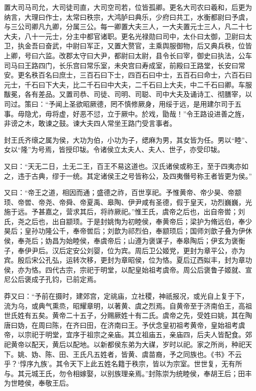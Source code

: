 \documentclass[12pt,UTF8]{ctexbook}
\begin{document}
置大司马司允，大司徒司直，大司空司若，位皆孤卿。更名大司农曰羲和，后更为纳言，大理曰作士，太常曰秩宗，大鸿胪曰典乐，少府曰共工，水衡都尉曰予虞，与三公司卿凡九卿，分属三公。每一卿置大夫三人，一大夫置元士三人，凡二十七大夫，八十一元士，分主中都官诸职。更名光禄勋曰司中，太仆曰太御，卫尉曰太卫，执金吾曰奋武，中尉曰军正，又置大赘官，主乘舆服御物，后又典兵秩，位皆上卿，号曰六监。改郡太守曰大尹，都尉曰太尉，县令长曰宰，御史曰执法，公车司马曰王路四门，长乐宫曰常乐室，未央宫曰寿成室，前殿曰王路堂，长安曰常安。更名秩百名曰庶士，三百石曰下士，四百石曰中士，五百石曰命士，六百石曰元士，千石曰下大夫，比二千石曰中大夫，二千石曰上大夫，中二千石曰卿。车服黻冕，各有差品。又置司恭、司徒、司明、司聪、司中大夫及诵诗工、彻膳宰，以司过。策曰：“予闻上圣欲昭厥德，罔不慎修厥身，用绥于远，是用建尔司于五事。毋隐尤，毋将虚，好恶不愆，立于厥中。於戏，勖哉！”令王路设进善之旌，非谤之木，敢谏之鼓。谏大夫四人常坐王路门受言事者。



封王氏齐缞之属为侯，大功为伯，小功为子，缌麻为男，其女皆为任。男以“睦”、女以“隆”为号焉，皆授印韨。令诸侯立太夫人、夫人、世子，亦受印韨。



又曰：“天无二日，土无二王，百王不易这道也。汉氏诸侯或称王，至于四夷亦如之，违于古典，缪于一统。其定诸侯王之号皆称公，及四夷僭号称王者皆更为侯。”



又曰：“帝王之道，相因而通；盛德之祚，百世享祀。予惟黄帝、帝少昊、帝颛顼、帝喾、帝尧、帝舜、帝夏禹、皋陶、伊尹咸有圣德，假于皇天，功烈巍巍，光施于远。予甚嘉之，营求其后，将祚厥祀。”惟王氏，虞帝之后也，出自帝喾；刘氏，尧之后也，出自颛顼。于是封姚恂为初睦侯，奉黄帝后；梁护为脩远伯，奉少昊后；皇孙功隆公千，奉帝喾后；刘歆为祁烈伯，奉颛顼后；国师刘歆子叠为伊休侯，奉尧后；妫昌为始睦侯，奉虞帝后；山遵为褒谋子，奉皋陶后；伊玄为褒衡子，奉伊尹后。汉后定安公刘婴，位为宾。周后卫公姬党，更封为章平公，亦为宾。殷后宋公孔弘，运转次移，更封为章昭侯，位为恪。夏后辽西姒丰，封为章功侯，亦为恪。四代古宗，宗祀于明堂，以配皇始祖考虞帝。周公后褒鲁子姬就、宣尼公后褒成子孔钧，已前定焉。



莽又曰：“予前在摄时，建郊宫，定祧庙，立社稷，神祇报况，或光自上复于下，流为乌，或典气熏烝，昭耀章明，以著黄、虞之烈焉。自黄帝至于济南伯王，高祖世氏姓有五矣。黄帝二十五子，分赐厥姓十有二氏。虞帝之先，受姓曰姚，其在陶唐曰妫，在周曰陈，在齐曰田，在济南曰王。予伏念皇初祖考黄帝，皇始祖考虞帝，以宗祀于明堂，宜序于祖宗之亲庙。其立祖庙五，亲庙四，后夫人皆配食。郊祀黄帝以配天，黄后以配地。以新都侯东弟为大禖，岁时以祀。家之所尚，种祀天下。姚、妫、陈、田、王氏凡五姓者，皆黄、虞苗裔，予之同族也。《书》不云乎？‘惇序九族’。其令天下上此五姓名籍于秩宗，皆以为宗室。世世复，无有所与。其元城王氏，勿令相嫁娶，以别族理亲焉。”封陈崇为统睦侯，奉胡王后；田丰为世睦侯，奉敬王后。
\end{document}
